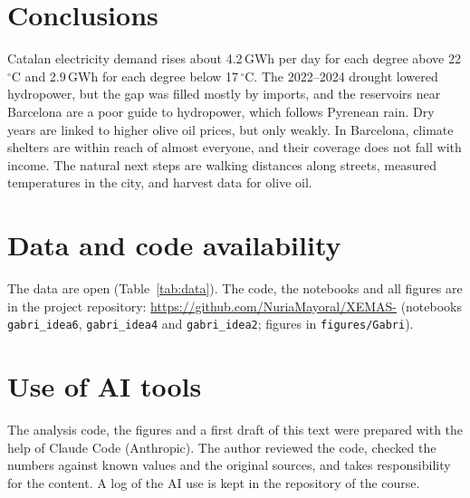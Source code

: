\documentclass[11pt,a4paper]{article}
\begin{document}
\section{Conclusions}

Catalan electricity demand rises about 4.2\,GWh per day for each degree above 22\,$^\circ$C and 2.9\,GWh for each degree below 17\,$^\circ$C. The 2022--2024 drought lowered hydropower, but the gap was filled mostly by imports, and the reservoirs near Barcelona are a poor guide to hydropower, which follows Pyrenean rain. Dry years are linked to higher olive oil prices, but only weakly. In Barcelona, climate shelters are within reach of almost everyone, and their coverage does not fall with income. The natural next steps are walking distances along streets, measured temperatures in the city, and harvest data for olive oil.

\section*{Data and code availability}
The data are open (Table~\ref{tab:data}). The code, the notebooks and all figures are in the project repository: \url{https://github.com/NuriaMayoral/XEMAS-} (notebooks \texttt{gabri\_idea6}, \texttt{gabri\_idea4} and \texttt{gabri\_idea2}; figures in \texttt{figures/Gabri}).

\section*{Use of AI tools}
The analysis code, the figures and a first draft of this text were prepared with the help of Claude Code (Anthropic). The author reviewed the code, checked the numbers against known values and the original sources, and takes responsibility for the content. A log of the AI use is kept in the repository of the course.



\end{document}
